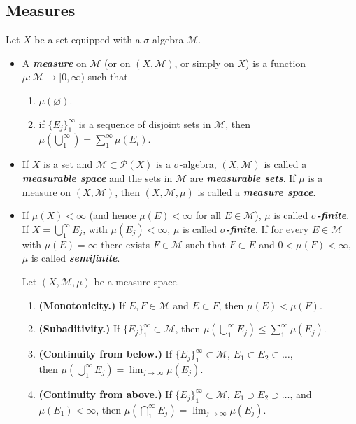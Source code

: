 \documentclass{article}
\theoremstyle{definition}
\numberwithin{equation}{section}
\begin{document}
	\subsection{Measures}
	Let $X$ be a set equipped with a $\sigma$-algebra $\mathcal{M}$.
	\begin{itemize}
		\item A \textbf{\textit{measure}} on $\mathcal{M}$ (or on $(X,\mathcal{M})$, or simply on $X$) is a function $\mu:\mathcal{M}\to [0,\infty)$ such that
		\begin{enumerate}
			\item $\mu(\varnothing)$.
			\item if $\{E_j\}_{1}^\infty$ is a sequence of disjoint sets in $\mathcal{M}$, then $\mu\left(\bigcup_{1}^\infty\right)=\sum_1^\infty\mu(E_i)$.
		\end{enumerate}
		\item If $X$ is a set and $\mathcal{M}\subset\mathcal{P}(X)$ is a $\sigma$-algebra, $(X,\mathcal{M})$ is called a \textbf{\textit{measurable space}} and the sets in $\mathcal{M}$ are \textbf{\textit{measurable sets}}. If $\mu$ is a measure on $(X,\mathcal{M})$, then $(X,\mathcal{M},\mu)$ is called a \textbf{\textit{measure space}}.
		\item If $\mu(X)<\infty$ (and hence $\mu(E)<\infty$ for all $E\in\mathcal{M}$), $\mu$ is called \textbf{\textit{$\sigma$-finite}}. If $X=\bigcup_{1}^\infty E_j$, with $\mu(E_j)<\infty$, $\mu$ is called \textbf{\textit{$\sigma$-finite}}. If for every $E\in\mathcal{M}$ with $\mu(E)=\infty$ there exists $F\in\mathcal{M}$ such that $F\subset E$ and $0<\mu(F)<\infty$, $\mu$ is called \textbf{\textit{semifinite}}.
		\begin{thm}
			Let $(X,\mathcal{M},\mu)$ be a measure space.
			\begin{enumerate}
				\item \textbf{(Monotonicity.)} If $E,F\in\mathcal{M}$ and $E\subset F$, then $\mu(E)<\mu(F)$.
				\item \textbf{(Subaditivity.)} If $\{E_j\}_{1}^\infty\subset\mathcal{M}$, then $\mu\left(\bigcup_{1}^\infty E_j\right)\leq\sum_1^\infty\mu(E_j)$.
				\item \textbf{(Continuity from below.)} If $\{E_j\}_1^\infty\subset\mathcal{M}$, $E_1\subset E_2\subset\ldots$,\\ then $\mu(\bigcup_1^\infty E_j)=\lim_{j\to\infty}\mu(E_j)$.
					\item \textbf{(Continuity from above.)} If $\{E_j\}_1^\infty\subset\mathcal{M}$, $E_1\supset E_2\supset\ldots$, and $\mu(E_1)<\infty$, then $\mu(\bigcap_1^\infty E_j)=\lim_{j\to\infty}\mu(E_j)$.

\end{enumerate}
\end{thm}
\end{itemize}
\end{document}
